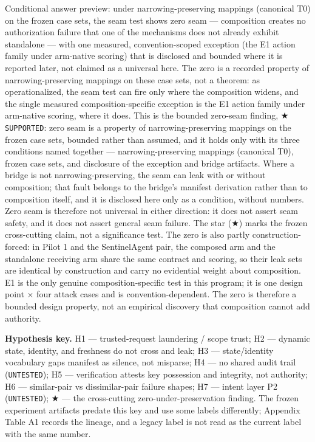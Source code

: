 \documentclass[
  10pt,
]{article}
\let\origtexttt\texttt
\renewcommand{\texttt}[1]{{\upshape\origtexttt{#1}}}
\renewcommand{\_}{\origunderscore\allowbreak}
\begin{document}
Conditional answer preview: under narrowing-preserving mappings
(canonical T0) on the frozen case sets, the seam test shows zero seam
--- composition creates no authorization failure that one of the
mechanisms does not already exhibit standalone --- with one measured,
convention-scoped exception (the E1 action family under arm-native
scoring) that is disclosed and bounded where it is reported later, not
claimed as a universal here. The zero is a recorded property of
narrowing-preserving mappings on these case sets, not a theorem: as
operationalized, the seam test can fire only where the composition
widens, and the single measured composition-specific exception is the E1
action family under arm-native scoring, where it does. This is the
bounded zero-seam finding, ★ \texttt{SUPPORTED}: zero seam is a property
of narrowing-preserving mappings on the frozen case sets, bounded rather
than assumed, and it holds only with its three conditions named together
--- narrowing-preserving mappings (canonical T0), frozen case sets, and
disclosure of the exception and bridge artifacts. Where a bridge is not
narrowing-preserving, the seam can leak with or without composition;
that fault belongs to the bridge's manifest derivation rather than to
composition itself, and it is disclosed here only as a condition,
without numbers. Zero seam is therefore not universal in either
direction: it does not assert seam safety, and it does not assert
general seam failure. The star (★) marks the frozen cross-cutting claim,
not a significance test. The zero is also partly construction-forced: in
Pilot 1 and the SentinelAgent pair, the composed arm and the standalone
receiving arm share the same contract and scoring, so their leak sets
are identical by construction and carry no evidential weight about
composition. E1 is the only genuine composition-specific test in this
program; it is one design point × four attack cases and is
convention-dependent. The zero is therefore a bounded design property,
not an empirical discovery that composition cannot add authority.

\textbf{Hypothesis key.} H1 --- trusted-request laundering / scope
trust; H2 --- dynamic state, identity, and freshness do not cross and
leak; H3 --- state/identity vocabulary gaps manifest as silence, not
misparse; H4 --- no shared audit trail (\texttt{UNTESTED}); H5 ---
verification attests key possession and integrity, not authority; H6 ---
similar-pair vs dissimilar-pair failure shapes; H7 --- intent layer P2
(\texttt{UNTESTED}); ★ --- the cross-cutting zero-under-preservation
finding. The frozen experiment artifacts predate this key and use some
labels differently; Appendix Table A1 records the lineage, and a legacy
label is not read as the current label with the same number.
\end{document}

